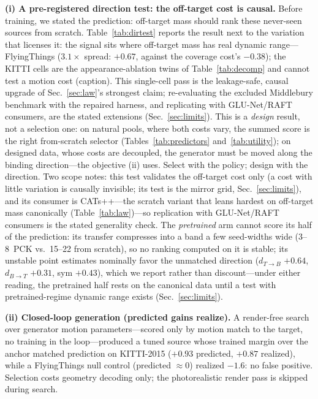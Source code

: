 \documentclass[runningheads]{llncs}
\newcommand{\dtb}{d_{T\to B}}
\newcommand{\dbt}{d_{B\to T}}
\newcommand{\pck}{PCK}
\begin{document}
\noindent\textbf{(i) A pre-registered direction test: the off-target cost
is causal.}
Before training, we stated the prediction: off-target mass should rank
these never-seen sources from scratch. Table~\ref{tab:dirtest} reports the
result next to the variation that licenses it: the signal sits where
off-target mass has real dynamic range---FlyingThings ($3.1\times$ spread:
$+0.67$, against the coverage cost's $-0.38$); the KITTI cells are the
appearance-ablation twins of Table~\ref{tab:decomp} and cannot test a
motion cost (caption). This single-cell pass is the leakage-safe, causal
upgrade of Sec.~\ref{sec:law}'s strongest claim; re-evaluating the excluded
Middlebury benchmark with the repaired harness, and replicating with
GLU-Net/RAFT consumers, are the stated extensions
(Sec.~\ref{sec:limits}). This is a \emph{design} result, not a selection
one: on natural pools, where both costs vary, the
summed score is the right from-scratch selector
(Tables~\ref{tab:predictors} and~\ref{tab:utility}); on designed data,
whose costs are decoupled, the generator must be moved along the binding
direction---the objective (ii) uses. Select with the policy; design with
the direction. Two scope notes: this test validates the off-target cost
only (a cost with little variation is causally invisible; its test is the
mirror grid, Sec.~\ref{sec:limits}), and its consumer is CATs++---the scratch
variant that leans hardest on off-target mass canonically
(Table~\ref{tab:law})---so replication with GLU-Net/RAFT consumers is the
stated generality check. The \emph{pretrained} arm cannot score its half of
the prediction: its transfer compresses into a band a few seed-widths wide
(3--8~\pck{} vs.\ 15--22 from scratch), so no ranking computed on it is
stable; its unstable point estimates nominally favor the unmatched
direction ($\dtb$ $+0.64$, $\dbt$ $+0.31$, sym $+0.43$), which we report
rather than discount---under either reading, the pretrained half rests on
the canonical data until a test with pretrained-regime dynamic range exists
(Sec.~\ref{sec:limits}).

\noindent\textbf{(ii) Closed-loop generation (predicted gains realize).}
A render-free search over generator motion parameters---scored only by
motion match to the target, no training in the loop---produced a tuned source
whose trained margin over the anchor matched prediction on KITTI-2015
($+0.93$ predicted, $+0.87$ realized), while a FlyingThings null control
(predicted ${\approx}0$) realized $-1.6$: no false positive. Selection costs
geometry decoding only; the photorealistic render pass is skipped during
search.
\end{document}
